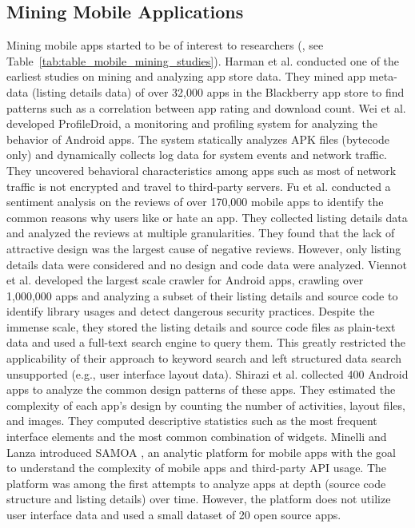 \subsection{Mining Mobile Applications}
Mining mobile apps started to be of interest to researchers (\cite{Enck_2010_OSDI,Enck_2011_USENIX,Ma_WWW_2012,crussell_2012_ESORICS,Frank_2012_ICDM,zhou_2012_SP_dissecting,Yin_2013_WSDM,Petsas_2013_IMC,Minelli_2013_CMSREuro,Pandita_2013_USENIX,gorla_2014_ICSE,chen_2014_ICSE,Liu_2014_ICSE,Lin_2014_SOUPS,rasthofer_2014_NDSS,Liu_2015_MobiSys,seneviratne_2015_SIGMobile,Yang_2015_ICSE,Baeza-Yates_2015_WSDM,Chen_2015_WSDM,Liu_2015_WSDM,Tufano_ICSE_2015,Park_SIGIR_2015}, see Table~\ref{tab:table_mobile_mining_studies}).
Harman et al. \cite{Harman_2012_MSR} conducted one of the earliest studies on mining and analyzing app store data.
They mined app meta-data (listing details data) of over 32,000 apps in the Blackberry app store to find patterns such as a correlation between app rating and download count.
Wei et al. \cite{Wei_2012_MobiCom} developed ProfileDroid, a monitoring and profiling system for analyzing the behavior of Android apps.
The system statically analyzes APK files (bytecode only) and dynamically collects log data for system events and network traffic.
They uncovered behavioral characteristics among apps such as most of network traffic is not encrypted and travel to third-party servers.
Fu et al. \cite{fu_2013_KDD} conducted a sentiment analysis on the reviews of over 170,000 mobile apps to identify the common reasons why users like or hate an app.
They collected listing details data and analyzed the reviews at multiple granularities.
They found that the lack of attractive design was the largest cause of negative reviews.
However, only listing details data were considered and no design and code data were analyzed.
Viennot et al. \cite{viennot_2014_metrics} developed the largest scale crawler for Android apps, crawling over 1,000,000 apps and analyzing a subset of their listing details and source code to identify library usages and detect dangerous security practices.
Despite the immense scale, they stored the listing details and source code files as plain-text data and used a full-text search engine to query them.
This greatly restricted the applicability of their approach to keyword search and left structured data search unsupported (e.g., user interface layout data).
Shirazi et al. \cite{shirazi_EICS_2013} collected 400 Android apps to analyze the common design patterns of these apps.
They estimated the complexity of each app's design by counting the number of activities, layout files, and images.
They computed descriptive statistics such as the most frequent interface elements and the most common combination of widgets.
Minelli and Lanza introduced SAMOA \cite{Minelli_2013_CMSREuro}, an analytic platform for mobile apps with the goal to understand the complexity of mobile apps and third-party API usage.
The platform was among the first attempts to analyze apps at depth (source code structure and listing details) over time.
However, the platform does not utilize user interface data and used a small dataset of 20 open source apps.

